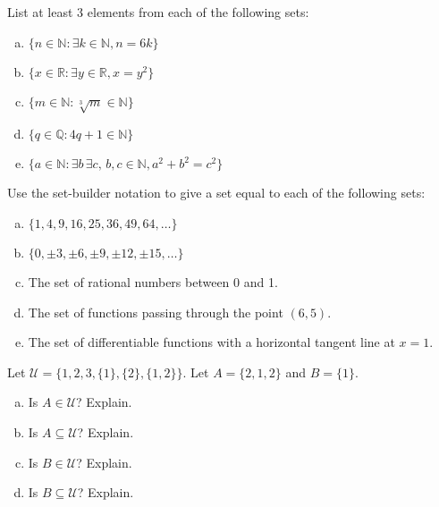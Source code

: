 \documentclass[11pt,letterpaper]{article}
\begin{document}
\homework{}

 List at least 3 elements from each of the following sets:
        \begin{enumerate}[(a)]
        \item $\{ n \in \mathbb{N} \colon \exists k \in \mathbb{N}, n= 6k \}$
        \item $\{ x \in \mathbb{R} \colon \exists y \in \mathbb{R}, x= y^2 \}$
        \item $\{ m \in \mathbb{N} \colon \sqrt[3]{m} \in \mathbb{N} \}$
        \item $\{ q \in \mathbb{Q} \colon 4q + 1 \in \mathbb{N} \}$
        \item $\{ a \in \mathbb{N} \colon \exists b\, \exists c,\, b, c \in \mathbb{N}, a^2 + b^2= c^2 \}$
        \end{enumerate}





\newpage





 Use the set-builder notation to give a set equal to each of the following sets:
        \begin{enumerate}[(a)]
        \item $\{ 1, 4, 9, 16, 25, 36, 49, 64, \ldots \}$
        \item $\{ 0, \pm 3, \pm 6, \pm 9, \pm 12, \pm 15, \ldots \}$
        \item The set of rational numbers between 0 and 1.  
        \item The set of functions passing through the point $(6, 5)$. 
        \item The set of differentiable functions with a horizontal tangent line at $x= 1$.
        \end{enumerate}





\newpage





 Let $\mathscr{U}= \{ 1, 2, 3, \{1\}, \{2\}, \{1,2\} \}$. Let $A= \{ 2, 1, 2 \}$ and $B= \{ 1 \}$. 
	\begin{enumerate}[(a)]
	\item Is $A \in \mathscr{U}$? Explain.
	\item Is $A \subseteq \mathscr{U}$? Explain.
	\item Is $B \in \mathscr{U}$? Explain. 
	\item Is $B \subseteq \mathscr{U}$? Explain. 
	\end{enumerate}
\end{document}
